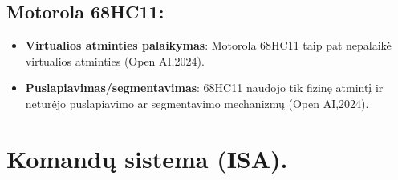 \documentclass[a4paper,12pt]{article}
\begin{document}
\subsection{Motorola 68HC11:}
\begin{itemize}
    \item \textbf{Virtualios atminties palaikymas}: Motorola 68HC11 taip pat nepalaikė virtualios atminties (Open AI,2024).
    \item \textbf{Puslapiavimas/segmentavimas}: 68HC11 naudojo tik fizinę atmintį ir neturėjo puslapiavimo ar segmentavimo mechanizmų (Open AI,2024).
\end{itemize}

\section{Komandų sistema (ISA).}
\end{document}
